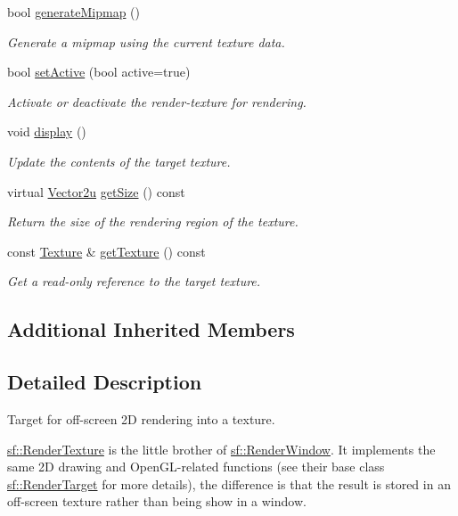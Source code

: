\begin{DoxyCompactItemize}
bool \hyperlink{classsf_1_1_render_texture_a8ca34c8b7e00793c1d3ef4f9a834f8cc}{generate\+Mipmap} ()
\begin{DoxyCompactList}\small\item\em Generate a mipmap using the current texture data. \end{DoxyCompactList}\item 
bool \hyperlink{classsf_1_1_render_texture_a5da95ecdbce615a80bb78399012508cf}{set\+Active} (bool active=true)
\begin{DoxyCompactList}\small\item\em Activate or deactivate the render-\/texture for rendering. \end{DoxyCompactList}\item 
void \hyperlink{classsf_1_1_render_texture_af92886d5faef3916caff9fa9ab32c555}{display} ()
\begin{DoxyCompactList}\small\item\em Update the contents of the target texture. \end{DoxyCompactList}\item 
virtual \hyperlink{classsf_1_1_vector2}{Vector2u} \hyperlink{classsf_1_1_render_texture_a6685315b5c4c25a5dcb75b4280b381ba}{get\+Size} () const
\begin{DoxyCompactList}\small\item\em Return the size of the rendering region of the texture. \end{DoxyCompactList}\item 
const \hyperlink{classsf_1_1_texture}{Texture} \& \hyperlink{classsf_1_1_render_texture_a07ecea85f05932fa02a8279416721bc9}{get\+Texture} () const
\begin{DoxyCompactList}\small\item\em Get a read-\/only reference to the target texture. \end{DoxyCompactList}\end{DoxyCompactItemize}
\subsection*{Additional Inherited Members}


\subsection{Detailed Description}
Target for off-\/screen 2D rendering into a texture. 

\hyperlink{classsf_1_1_render_texture}{sf\+::\+Render\+Texture} is the little brother of \hyperlink{classsf_1_1_render_window}{sf\+::\+Render\+Window}. It implements the same 2D drawing and Open\+G\+L-\/related functions (see their base class \hyperlink{classsf_1_1_render_target}{sf\+::\+Render\+Target} for more details), the difference is that the result is stored in an off-\/screen texture rather than being show in a window.

